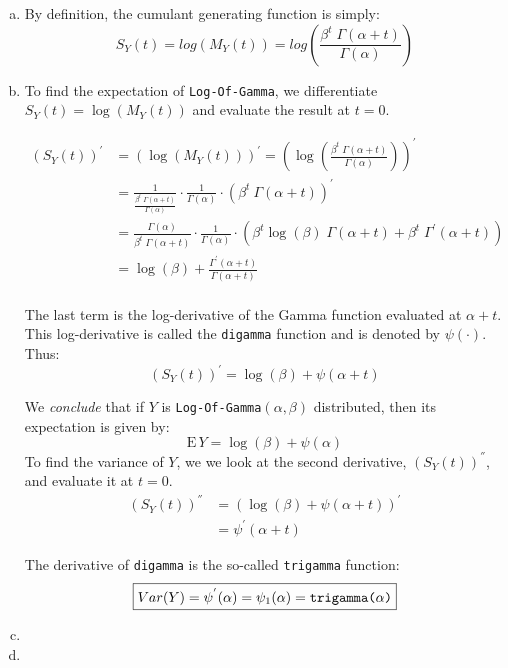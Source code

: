 \documentclass[12pt]{article}
\begin{document}
\begin{enumerate}[(a)]

\item By definition, the cumulant generating function is simply:
$$
S_Y(t) = log(M_Y(t)) = log \left(\frac{\beta^t \; \Gamma(\alpha + t)}{\Gamma(\alpha)} \right)
$$
\item 
To find the expectation of \texttt{Log-Of-Gamma}, we differentiate $S_Y(t) = \log (M_Y(t))$ and evaluate the result at $t = 0$.

\begin{align*}
(S_Y(t))^{'} &= (\log (M_Y(t)))^{'} = \left(\log \left(\frac{\beta^t \; \Gamma(\alpha + t)}{\Gamma(\alpha)} \right)\right)^{'} \\
&= \frac{1}{\frac{\beta^t \; \Gamma(\alpha + t)} {\Gamma(\alpha)}} \cdot \frac{1}{\Gamma(\alpha)} \cdot \left(  \beta^t \: \Gamma(\alpha + t)  \right)^{'}\\
&= \frac{\Gamma(\alpha)}{\beta^t \; \Gamma(\alpha + t)}  \cdot \frac{1}{\Gamma(\alpha)} \cdot \left(  \beta^t \log(\beta) \; \Gamma(\alpha + t) + \beta^t \; \Gamma^{'} (\alpha +t) \right)\\
&= \log(\beta) + \frac{\Gamma^{'} (\alpha +t) }{\Gamma(\alpha + t)}\\
\end{align*}


The last term is the log-derivative of the Gamma function evaluated at $\alpha + t$. This log-derivative is called the \texttt{digamma} function and is denoted by $\psi(\cdot)$. Thus:
$$
(S_Y(t))^{'} =  \log(\beta) +\psi(\alpha +t)
$$

We \emph{conclude} that if $Y$ is \texttt{Log-Of-Gamma}$(\alpha, \beta)$ distributed, then its expectation is given by:
$$
 \boxed{\mathrm{E}\, Y =  \log(\beta) +\psi(\alpha)}
$$
To find the variance of $Y$, we we look at the second derivative, $(S_Y(t))^{''}$, and evaluate it at $t=0$.
\begin{align*}
(S_Y(t))^{''} &= (\log(\beta) +\psi(\alpha +t))^{'}\\
&= \psi^{'}(\alpha +t)
\end{align*}

The derivative of \texttt{digamma} is the so-called \texttt{trigamma} function:
$$
\boxed{Var(Y) = \psi^{'}(\alpha) = \psi_1(\alpha) =  \text{\texttt{trigamma($\alpha$)}}}
$$

\item

\item

\end{enumerate}

 
\end{document}
